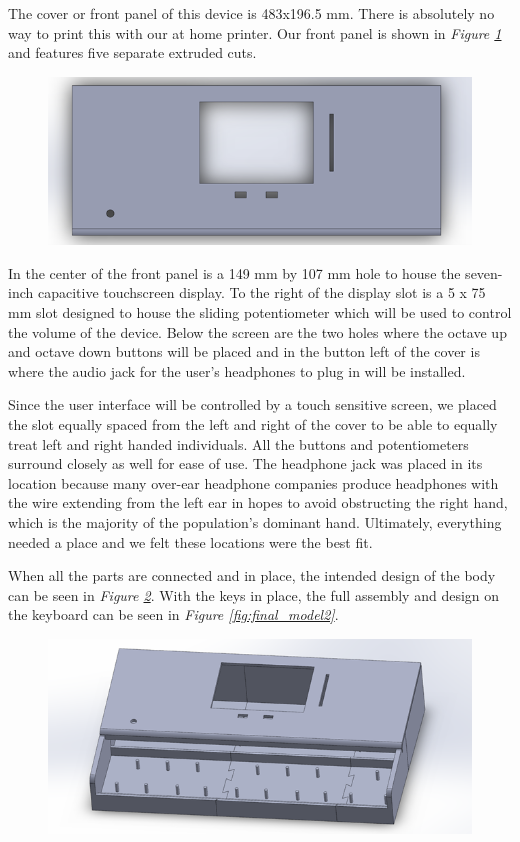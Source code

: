 The cover or front panel of this device is 483x196.5 mm. There is absolutely no way to print this with our at home printer. Our front panel is shown in \textit{Figure \ref{fig:display_model}} and features five separate extruded cuts.

\begin{figure}[h!]
  \centering
  \includegraphics[width=0.9\linewidth]{image/DisplayModel.png}
  \caption{}
  \label{fig:display_model}
\end{figure}

In the center of the front panel is a 149 mm by 107 mm hole to house the seven-inch capacitive touchscreen display. To the right of the display slot is a 5 x 75 mm slot designed to house the sliding potentiometer which will be used to control the volume of the device. Below the screen are the two holes where the octave up and octave down buttons will be placed and in the button left of the cover is where the audio jack for the user’s headphones to plug in will be installed.

Since the user interface will be controlled by a touch sensitive screen, we placed the slot equally spaced from the left and right of the cover to be able to equally treat left and right handed individuals. All the buttons and potentiometers surround closely as well for ease of use. The headphone jack was placed in its location because many over-ear headphone companies produce headphones with the wire extending from the left ear in hopes to avoid obstructing the right hand, which is the majority of the population’s dominant hand. Ultimately, everything needed a place and we felt these locations were the best fit.

When all the parts are connected and in place, the intended design of the body can be seen in \textit{Figure \ref{fig:final_model1}}. With the keys in place, the full assembly and design on the keyboard can be seen in \textit{Figure \ref{fig:final_model2}}.

\begin{figure}[h!]
  \centering
  \includegraphics[width=0.8\linewidth]{image/FinalModel1.png}
  \caption{}
  \label{fig:final_model1}
\end{figure}

